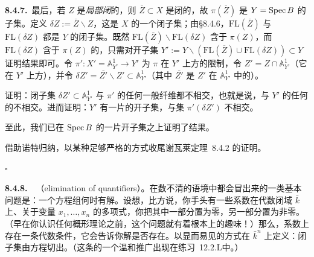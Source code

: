 \textbf{8.4.7.}\ 最后，若 $Z$ 是\emph{局部闭}的，则 $\overline{Z}\subset X$ 是闭的，故 $\pi(\overline{Z})$ 是 $Y=\operatorname{Spec} B$ 的\trConstructible{}子集。定义 $\delta Z:=\overline{Z}\smallsetminus Z$，这是 $X$ 的一个闭子集；由\S8.4.6，$\mathrm{FL}(\overline{Z})$ 与 $\mathrm{FL}(\delta Z)$ 都是 $Y$ 的闭子集。既然 $\mathrm{FL}(\overline{Z})\smallsetminus\mathrm{FL}(\delta Z)$ 含于 $\pi(Z)$，而 $\mathrm{FL}(\delta Z)$ 含于 $\pi(Z)$ 的\trComplement，只需对开子集 $Y':=Y\smallsetminus(\mathrm{FL}(\overline{Z})\cup\mathrm{FL}(\delta Z))\subset Y$ 证明结果即可。令 $\pi'\colon X'=\mathbb{A}^1_{Y'}\to Y'$ 为 $\pi$ 在 $Y'$ 上方的限制，令 $Z'=Z\cap\mathbb{A}^1_{Y'}$（它在 $Y'$ 上方\trQuasifinite{}），并令 $\delta Z'=\overline{Z'}\smallsetminus Z'\subset\mathbb{A}^1_{Y'}$（其中 $\overline{Z'}$ 是 $Z'$ 在 $\mathbb{A}^1_{Y'}$ 中的\trClosure）。

\begin{exercise}\label{ex:delta-z-generic-fibers}
证明：闭子集 $\delta Z'\subset\mathbb{A}^1_{Y'}$ 与 $\pi'$ 的任何一般纤维都不相交，也就是说，与 $Y'$ 的任何\trGenericPoint{}的\trInverseImage{}不相交。进而证明：$Y'$ 有一片\trDense{}的开子集，与\trConstructible{}集 $\pi'(\delta Z')$ 不相交。
\end{exercise}

至此，我们已在 $\operatorname{Spec} B$ 的一片\trDense{}开子集之上证明了结果。

\begin{exercise}\label{ex:chevalley-noetherian-induction}
借助诺特归纳，以某种足够严格的方式收尾谢瓦莱定理~8.4.2 的证明。
\end{exercise}

\hfill$\square$

\textbf{8.4.8.}\ \hard\ \textbf{\trEliminationOfQuantifiers{}}（elimination of quantifiers）。\quad 在数不清的语境中都会冒出来的一类基本问题是：一个方程组何时有解。设想，比方说，你手头有一些系数在代数闭域 $\bar{k}$ 上、关于变量 $x_1,\dots,x_n$ 的多项式，你把其中一部分置为零，另一部分置为非零。（早在你认识任何概形理论之前，这个问题就有着根本上的趣味！）那么，系数上存在一条代数条件，它会告诉你解是否存在。以显而易见的方式在 $\bar{k}^n$ 上定义\trZariskiTopology：闭子集由方程切出。（这条的一个温和推广出现在\mbox{练习~12.2.L}中。）

